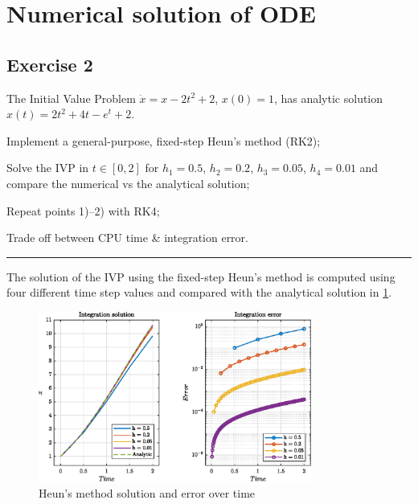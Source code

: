 \documentclass[11pt,a4paper,oneside]{article}
\begin{document}
\clearpage


\section{Numerical solution of ODE}
\subsection{Exercise 2}

The Initial Value Problem $\dot x = x- 2t^2+2$, $x(0) = 1$, has analytic solution $x(t) = 2t^2 + 4t - e^t + 2$. 
\begin{enumerate*}[label=\arabic*)]
    \item Implement a general-purpose, fixed-step Heun's method (RK2);
    \item Solve the IVP in $t\in[0,2]$ for $h_1 = 0.5$, $h_2 = 0.2$, $h_3 = 0.05$, $h_4 = 0.01$ and compare the numerical vs the analytical solution;
    \item Repeat points 1)--2) with RK4;
    \item Trade off between CPU time \& integration error.
\end{enumerate*}

\medskip \hrule \medskip

The solution of the IVP using the fixed-step Heun's method is computed using four different time step values and compared with the analytical solution in \cref{fig:ex2_heun}.

\begin{figure}[htb]
    \centering
    \includegraphics*[width=0.8\textwidth, keepaspectratio]{ex2_heun.eps}
    \caption[]{\label{fig:ex2_heun} Heun's method solution and error over time}
\end{figure}
\end{document}
